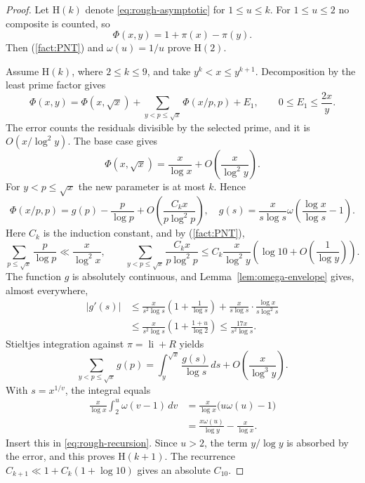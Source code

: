 \documentclass{amsart}
\newcounter{fact}
\numberwithin{equation}{section}
\numberwithin{table}{section}
\begin{document}
\begin{proof}
Let $\mathrm H(k)$ denote \eqref{eq:rough-asymptotic} for $1\le u\le k$.
For $1\le u\le2$ no composite is counted, so
\[
\Phi(x,y)=1+\pi(x)-\pi(y).
\]
Then (\ref{fact:PNT}) and $\omega(u)=1/u$ prove $\mathrm H(2)$.

Assume $\mathrm H(k)$, where $2\le k\le9$, and take $y^k<x\le y^{k+1}$.
Decomposition by the least prime factor gives
\begin{equation}\label{eq:rough-recursion}
\Phi(x,y)=\Phi(x,\sqrt x)
+\sum_{y<p\le\sqrt x}\Phi(x/p,p)+E_1,
\qquad 0\le E_1\le\frac{2x}{y}.
\end{equation}
The error counts the residuals divisible by the selected prime, and it is
$O(x/\log^2y)$. The base case gives
\[
\Phi(x,\sqrt{x})=\frac{x}{\log x}
+O\left(\frac{x}{\log^2y}\right).
\]
For $y<p\le\sqrt x$ the new parameter is at most $k$. Hence
\begin{equation}\label{eq:rough-induction-term}
\Phi(x/p,p)=g(p)-\frac{p}{\log p}
+O\left(\frac{C_kx}{p\log^2p}\right),
\quad
g(s)=\frac{x}{s\log s}\omega\left(\frac{\log x}{\log s}-1\right).
\end{equation}
Here $C_k$ is the induction constant, and by (\ref{fact:PNT}),
\[
\sum_{p\le\sqrt{x}}\frac{p}{\log p}\ll\frac{x}{\log^2x},
\qquad
\sum_{y<p\le\sqrt{x}}\frac{C_kx}{p\log^2p}
\le C_k\frac{x}{\log^2y}
\left(\log 10+O\left(\frac1{\log y}\right)\right).
\]
The function $g$ is absolutely continuous, and
Lemma~\ref{lem:omega-envelope} gives, almost everywhere,
\[
\begin{split}
|g'(s)|
&\le\frac{x}{s^2\log s}\left(1+\frac1{\log s}\right)
+\frac{x}{s\log s}\cdot\frac{\log x}{s\log^2s}\\
&\le\frac{x}{s^2\log s}
\left(1+\frac{1+u}{\log2}\right)
\le\frac{17x}{s^2\log s}.
\end{split}
\]
Stieltjes integration against $\pi=\operatorname{li}+R$ yields
\[
\sum_{y<p\le\sqrt{x}}g(p)
=\int_y^{\sqrt{x}}\frac{g(s)}{\log s}\,ds
+O\left(\frac{x}{\log^3y}\right).
\]
With $s=x^{1/v}$, the integral equals
\begin{align*}
\frac{x}{\log x}\int_2^u\omega(v-1)\,dv
&=\frac{x}{\log x}\bigl(u\omega(u)-1\bigr)\\
&=\frac{x\omega(u)}{\log y}-\frac{x}{\log x}.
\end{align*}
Insert this in \eqref{eq:rough-recursion}. Since $u>2$, the term
$y/\log y$ is absorbed by the error, and this proves $\mathrm H(k+1)$.
The recurrence $C_{k+1}\ll1+C_k(1+\log10)$ gives an absolute $C_{10}$.
\end{proof}
\end{document}
